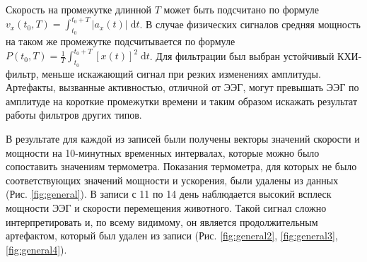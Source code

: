 \documentclass[12pt,a4paper,oneside]{article}
\begin{document}
Скорость на промежутке длинной $T$ может быть подсчитано по формуле $v_{x}(t_0, T) = \int_{t_0}^{t_0 + T} | a_{x}(t)| \; \text{d}t$. В случае физических сигналов средняя мощность на таком же промежутке подсчитывается по формуле $P(t_0, T) = \frac{1}{T} \int_{t_0}^{t_0 + T} [x(t)]^2 \; \text{d}t$. Для фильтрации был выбран устойчивый КХИ-фильтр, меньше искажающий сигнал при резких изменениях амплитуды. Артефакты, вызванные активностью, отличной от ЭЭГ, могут превышать ЭЭГ по амплитуде на короткие промежутки времени и таким образом искажать результат работы фильтров других типов.

В результате для каждой из записей были получены векторы значений скорости и мощности на 10-минутных временных интервалах, которые можно было сопоставить значениям термометра. Показания термометра, для которых не было соответствующих значений мощности и ускорения, были удалены из данных (Рис. \ref{fig:general}). В записи с 11 по 14 день наблюдается высокий всплеск мощности ЭЭГ и скорости перемещения животного. Такой сигнал сложно интерпретировать и, по всему видимому, он является продолжительным артефактом, который был удален из записи (Рис. \ref{fig:general2}, \ref{fig:general3}, \ref{fig:general4}). 
\end{document}
